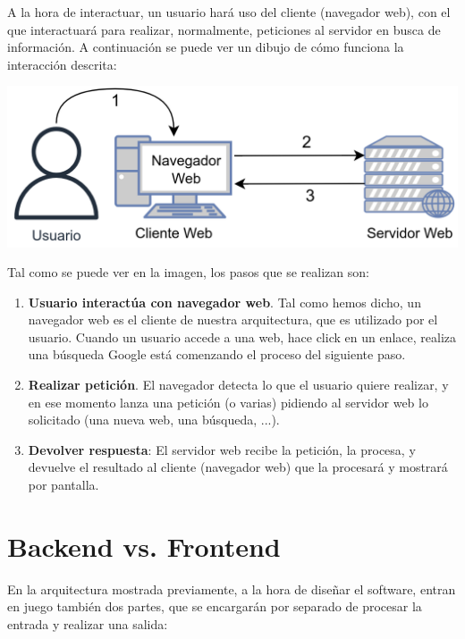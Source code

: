 \documentclass{\ClassPath/viu-tfm-template}
\begin{document}
A la hora de interactuar, un usuario hará uso del cliente (navegador web), con el que interactuará para realizar, normalmente, peticiones al servidor en busca de información. A continuación se puede ver un dibujo de cómo funciona la interacción descrita:


\begin{center}
    \includegraphics[width=0.6\linewidth]{img/cliente_servidor.png}
\end{center}

Tal como se puede ver en la imagen, los pasos que se realizan son:

\begin{enumerate}
    \item \textbf{Usuario interactúa con navegador web}. Tal como hemos dicho, un navegador web es el cliente de nuestra arquitectura, que es utilizado por el usuario. Cuando un usuario accede a una web, hace click en un enlace, realiza una búsqueda Google está comenzando el proceso del siguiente paso.

    \item \textbf{Realizar petición}. El navegador detecta lo que el usuario quiere realizar, y en ese momento lanza una petición (o varias) pidiendo al servidor web lo solicitado (una nueva web, una búsqueda, ...).

    \item \textbf{Devolver respuesta}: El servidor web recibe la petición, la procesa, y devuelve el resultado al cliente (navegador web) que la procesará y mostrará por pantalla.
\end{enumerate}

\section{Backend vs. Frontend}
En la arquitectura mostrada previamente, a la hora de diseñar el software, entran en juego también dos partes, que se encargarán por separado de procesar la entrada y realizar una salida:
\end{document}
